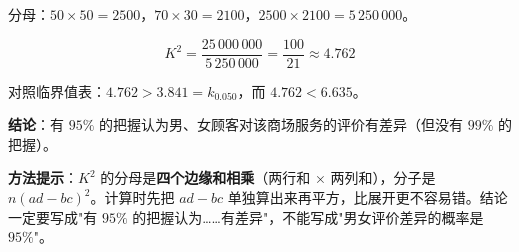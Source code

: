 \begin{answer}
分母：$50\times50=2500$，$70\times30=2100$，$2500\times2100=5\,250\,000$。

\nopagebreak[4]
\[K^{2}=\frac{25\,000\,000}{5\,250\,000}=\frac{100}{21}\approx4.762\]

对照临界值表：$4.762>3.841=k_{0.050}$，而 $4.762<6.635$。

\textbf{结论}：有 $95\%$ 的把握认为男、女顾客对该商场服务的评价有差异（但没有 $99\%$ 的把握）。

\begin{gktip}
\textbf{方法提示}：$K^{2}$ 的分母是\textbf{四个边缘和相乘}（两行和 × 两列和），分子是 $n(ad-bc)^{2}$。计算时先把 $ad-bc$ 单独算出来再平方，比展开更不容易错。结论一定要写成"有 $95\%$ 的把握认为……有差异"，不能写成"男女评价差异的概率是 $95\%$"。
\end{gktip}



\par\medskip

\end{answer}
